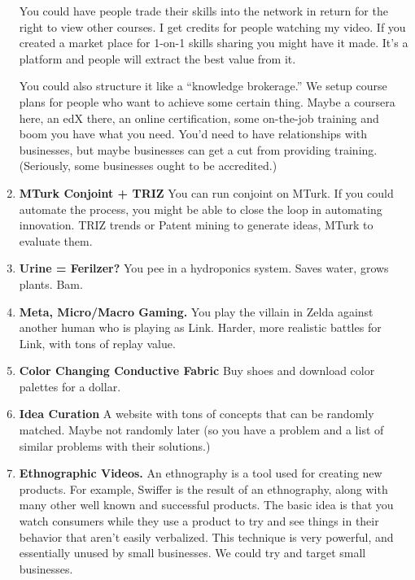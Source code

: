 \documentclass[paper=a4, fontsize=11pt]{scrartcl} %
\numberwithin{equation}{section} %
\numberwithin{figure}{section} %
\numberwithin{table}{section} %
\begin{document}
\begin{enumerate}
You could have people trade their skills into the network in return for the right to view other courses.  I get credits for people watching my video.  If you created a market place for 1-on-1 skills sharing you might have it made.  It's a platform and people will extract the best value from it.

You could also structure it like a ``knowledge brokerage.''  We setup course plans for people who want to achieve some certain thing.  Maybe a coursera here, an edX there, an online certification, some on-the-job training and boom you have what you need.  You'd need to have relationships with businesses, but maybe businesses can get a cut from providing training.  (Seriously, some businesses ought to be accredited.)  

\item \textbf{MTurk Conjoint + TRIZ}  You can run conjoint on MTurk.  If you could automate the process, you might be able to close the loop in automating innovation.  TRIZ trends or Patent mining to generate ideas, MTurk to evaluate them.  

\item \textbf{Urine = Ferilzer?}  You pee in a hydroponics system.  Saves water, grows plants.  Bam.

\item \textbf{Meta, Micro/Macro Gaming.}  You play the villain in Zelda against another human who is playing as Link.  Harder, more realistic battles for Link, with tons of replay value.

\item \textbf{Color Changing Conductive Fabric} Buy shoes and download color palettes for a dollar.

\item \textbf{Idea Curation} A website with tons of concepts that can be randomly matched.  Maybe not randomly later (so you have a problem and a list of similar problems with their solutions.) 

\item \textbf{Ethnographic Videos.}  An ethnography is a tool used for creating new products.  For example, Swiffer is the result of an ethnography, along with many other well known and successful products.  The basic idea is that you watch consumers while they use a product to try and see things in their behavior that aren't easily verbalized.  This technique is very powerful, and essentially unused by small businesses.  We could try and target small businesses.


\end{enumerate}
\end{document}
